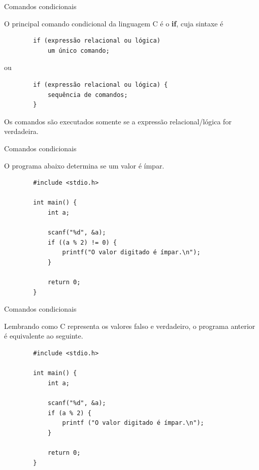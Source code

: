 \documentclass[handout]{beamer}
\begin{document}
\begin{frame}[fragile]{Comandos condicionais}

    O principal comando condicional da linguagem C é o {\bf if}, cuja sintaxe é

    \begin{verbatim}
        if (expressão relacional ou lógica)
            um único comando;
    \end{verbatim}

    ou

    \begin{verbatim}
        if (expressão relacional ou lógica) {
            sequência de comandos;
        }
    \end{verbatim}

    Os comandos são executados somente se a expressão relacional/lógica for verdadeira.
\end{frame}

\begin{frame}[fragile]{Comandos condicionais}

    O programa abaixo determina se um valor é ímpar.
    \pause

    \begin{verbatim}
        #include <stdio.h>

        int main() {
            int a;

            scanf("%d", &a);
            if ((a % 2) != 0) {
                printf("O valor digitado é ímpar.\n");
            }

            return 0;
        }
    \end{verbatim}
\end{frame}

\begin{frame}[fragile]{Comandos condicionais}

    Lembrando como C representa os valores falso e verdadeiro, o programa anterior é equivalente ao seguinte.

    \begin{verbatim}
        #include <stdio.h>

        int main() {
            int a;

            scanf("%d", &a);
            if (a % 2) {
                printf ("O valor digitado é ímpar.\n");
            }

            return 0;
        }
    \end{verbatim}
\end{frame}
\end{document}
